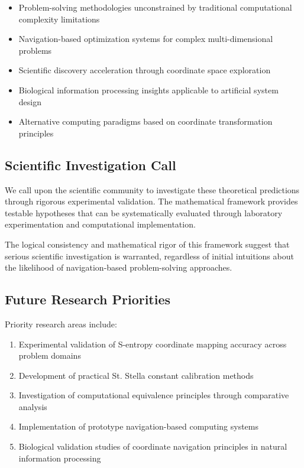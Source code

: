 \documentclass[11pt]{article}
\begin{document}
\begin{itemize}
\item Problem-solving methodologies unconstrained by traditional computational complexity limitations
\item Navigation-based optimization systems for complex multi-dimensional problems
\item Scientific discovery acceleration through coordinate space exploration
\item Biological information processing insights applicable to artificial system design
\item Alternative computing paradigms based on coordinate transformation principles
\end{itemize}

\subsection{Scientific Investigation Call}

We call upon the scientific community to investigate these theoretical predictions through rigorous experimental validation. The mathematical framework provides testable hypotheses that can be systematically evaluated through laboratory experimentation and computational implementation.

The logical consistency and mathematical rigor of this framework suggest that serious scientific investigation is warranted, regardless of initial intuitions about the likelihood of navigation-based problem-solving approaches.

\subsection{Future Research Priorities}

Priority research areas include:

\begin{enumerate}
\item Experimental validation of S-entropy coordinate mapping accuracy across problem domains
\item Development of practical St. Stella constant calibration methods
\item Investigation of computational equivalence principles through comparative analysis
\item Implementation of prototype navigation-based computing systems
\item Biological validation studies of coordinate navigation principles in natural information processing
\end{enumerate}
\end{document}
